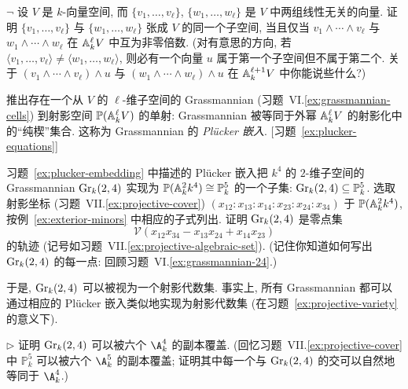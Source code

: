 \begin{prob}\label{ex:plucker-embedding}
$\neg$ 设 $V$ 是 $k$-向量空间, 而 $\{v_1,\dots,v_\ell\}$, $\{w_1,\dots,w_\ell\}$ 是 $V$ 中两组线性无关的向量. 证明 $\{v_1,\dots,v_\ell\}$ 与 $\{w_1,\dots,w_\ell\}$ 张成 $V$ 的同一个子空间, 当且仅当 $v_1\wedge\cdots\wedge v_\ell$ 与 $w_1\wedge\cdots\wedge w_\ell$ 在 $\mathbb{A}_k^\ell V$ 中互为非零倍数. (对有意思的方向, 若 $\langle v_1,\dots,v_\ell\rangle\neq\langle w_1,\dots,w_\ell\rangle$, 则必有一个向量 $u$ 属于第一个子空间但不属于第二个. 关于 $(v_1\wedge\cdots\wedge v_\ell)\wedge u$ 与 $(w_1\wedge\cdots\wedge w_\ell)\wedge u$ 在 $\mathbb{A}_k^{\ell+1}V$ 中你能说些什么?)

推出存在一个从 $V$ 的 $\ell$-维子空间的 Grassmannian (习题~VI.\ref{ex:grassmannian-cells}) 到射影空间 $\mathbb{P}(\mathbb{A}_k^\ell V)$ 的单射: Grassmannian 被等同于外幂 $\mathbb{A}_k^\ell V$ 的射影化中的``纯楔''集合. 这称为 Grassmannian 的 \emph{Plücker 嵌入}. [习题~\ref{ex:plucker-equations}]
\end{prob}

\begin{prob}\label{ex:plucker-equations}
习题~\ref{ex:plucker-embedding} 中描述的 Plücker 嵌入把 $k^4$ 的 $2$-维子空间的 Grassmannian $\operatorname{Gr}_k(2,4)$ 实现为 $\mathbb{P}(\mathbb{A}_k^2k^4)\cong\mathbb{P}^5_k$ 的一个子集: $\operatorname{Gr}_k(2,4)\subseteq\mathbb{P}^5_k$. 选取射影坐标 (习题~VII.\ref{ex:projective-cover}) $(x_{12}:x_{13}:x_{14}:x_{23}:x_{24}:x_{34})$ 于 $\mathbb{P}(\mathbb{A}_k^2k^4)$, 按例~\ref{ex:exterior-minors} 中相应的子式列出. 证明 $\operatorname{Gr}_k(2,4)$ 是零点集
\[
\mathscr{V}(x_{12}x_{34}-x_{13}x_{24}+x_{14}x_{23})
\]
的轨迹 (记号如习题~VII.\ref{ex:projective-algebraic-set}). (记住你知道如何写出 $\operatorname{Gr}_k(2,4)$ 的每一点: 回顾习题~VI.\ref{ex:grassmannian-24}.)

于是, $\operatorname{Gr}_k(2,4)$ 可以被视为一个射影代数集. 事实上, 所有 Grassmannian 都可以通过相应的 Plücker 嵌入类似地实现为射影代数集 (在习题~\ref{ex:projective-variety} 的意义下).

$\triangleright$ 证明 $\operatorname{Gr}_k(2,4)$ 可以被六个 $\A_k^4$ 的副本覆盖. (回忆习题~VII.\ref{ex:projective-cover} 中 $\mathbb{P}^5_k$ 可以被六个 $\A_k^5$ 的副本覆盖; 证明其中每一个与 $\operatorname{Gr}_k(2,4)$ 的交可以自然地等同于 $\A_k^4$.)
\end{prob}

